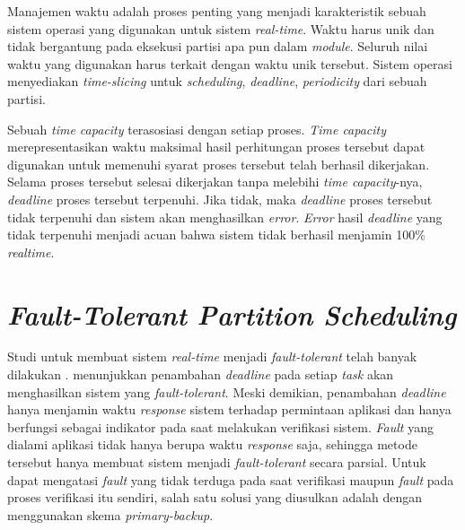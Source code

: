 Manajemen waktu adalah proses penting yang menjadi karakteristik sebuah sistem operasi yang
digunakan untuk sistem \textit{real-time}.  Waktu harus unik dan tidak bergantung pada eksekusi
partisi apa pun dalam \textit{module}.  Seluruh nilai waktu yang digunakan harus terkait dengan
waktu unik tersebut.  Sistem operasi menyediakan \textit{time-slicing} untuk
\textit{scheduling}, \textit{deadline}, \textit{periodicity} dari sebuah partisi.

Sebuah \textit{time capacity} terasosiasi dengan setiap proses.  \textit{Time capacity}
merepresentasikan waktu maksimal hasil perhitungan proses tersebut dapat digunakan untuk
memenuhi syarat proses tersebut telah berhasil dikerjakan.  Selama proses tersebut selesai
dikerjakan tanpa melebihi \textit{time capacity}-nya, \textit{deadline} proses tersebut
terpenuhi. Jika tidak, maka \textit{deadline} proses tersebut tidak terpenuhi dan sistem akan
menghasilkan \textit{error}.  \textit{Error} hasil \textit{deadline} yang tidak terpenuhi
menjadi acuan bahwa sistem tidak berhasil menjamin 100\% \textit{realtime}.

\section{\textit{Fault-Tolerant Partition Scheduling}}

Studi untuk membuat sistem \textit{real-time} menjadi \textit{fault-tolerant} telah banyak
dilakukan \citep{Campbell1986} \citep{Bertossi2006}. \citet{Campbell1986} menunjukkan penambahan
\textit{deadline} pada setiap \textit{task} akan menghasilkan sistem yang
\textit{fault-tolerant}.  Meski demikian, penambahan \textit{deadline} hanya menjamin waktu
\textit{response} sistem terhadap permintaan aplikasi dan hanya berfungsi sebagai indikator pada
saat melakukan verifikasi sistem.  \textit{Fault} yang dialami aplikasi tidak hanya berupa waktu
\textit{response} saja, sehingga metode tersebut hanya membuat sistem menjadi
\textit{fault-tolerant} secara parsial.  Untuk dapat mengatasi \textit{fault} yang tidak terduga
pada saat verifikasi maupun \textit{fault} pada proses verifikasi itu sendiri, salah satu solusi
yang diusulkan adalah dengan menggunakan skema \textit{primary-backup}.

